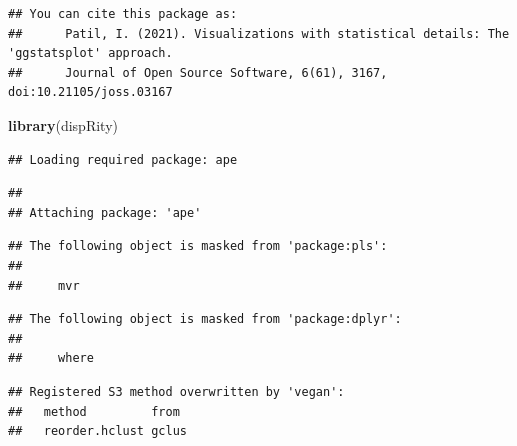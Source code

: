 \documentclass[
]{article}
\newenvironment{Shaded}{\begin{snugshade}}{\end{snugshade}}
\newcommand{\FunctionTok}[1]{\textcolor[rgb]{0.13,0.29,0.53}{\textbf{#1}}}
\newcommand{\NormalTok}[1]{#1}
\begin{document}
\begin{verbatim}
## You can cite this package as:
##      Patil, I. (2021). Visualizations with statistical details: The 'ggstatsplot' approach.
##      Journal of Open Source Software, 6(61), 3167, doi:10.21105/joss.03167
\end{verbatim}

\begin{Shaded}
\begin{Highlighting}[]
\FunctionTok{library}\NormalTok{(dispRity)}
\end{Highlighting}
\end{Shaded}

\begin{verbatim}
## Loading required package: ape
\end{verbatim}

\begin{verbatim}
## 
## Attaching package: 'ape'
\end{verbatim}

\begin{verbatim}
## The following object is masked from 'package:pls':
## 
##     mvr
\end{verbatim}

\begin{verbatim}
## The following object is masked from 'package:dplyr':
## 
##     where
\end{verbatim}

\begin{verbatim}
## Registered S3 method overwritten by 'vegan':
##   method         from 
##   reorder.hclust gclus
\end{verbatim}
\end{document}
